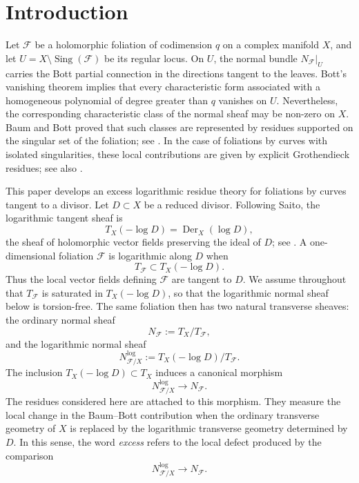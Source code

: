 \documentclass[12pt,reqno,a4paper]{amsart}
\numberwithin{equation}{section}
\theoremstyle{plain}
\theoremstyle{definition}
\DeclareMathOperator{\Sing}{Sing}
\newcommand{\cF}{\mathcal{F}}
\newcommand{\Der}{\operatorname{Der}}
\begin{document}
 


 




\section{Introduction}

 

 
 

Let \(\cF\) be a holomorphic foliation of codimension \(q\) on a complex
manifold \(X\), and let \(U=X\setminus \Sing(\cF)\) be its regular locus. On
\(U\), the normal bundle \(N_{\cF}|_U\) carries the Bott partial connection in
the directions tangent to the leaves. Bott's vanishing theorem implies that
every characteristic form associated with a homogeneous polynomial of degree
greater than \(q\) vanishes on \(U\). Nevertheless, the corresponding
characteristic class of the normal sheaf may be non-zero on \(X\). Baum and
Bott proved that such classes are represented by residues supported on the
singular set of the foliation; see \cite{BB2,BB1}. In the case of foliations by
curves with isolated singularities, these local contributions are given by
explicit Grothendieck residues; see also \cite{Suwa}.

This paper develops an excess logarithmic residue theory for foliations by
curves tangent to a divisor. Let \(D\subset X\) be a reduced divisor. Following
Saito, the logarithmic tangent sheaf is
\[
T_X(-\log D)=\Der_X(\log D),
\]
the sheaf of holomorphic vector fields preserving the ideal of \(D\); see
\cite{Saito}. A one-dimensional foliation \(\cF\) is logarithmic along \(D\)
when
\[
T_{\cF}\subset T_X(-\log D).
\]
Thus the local vector fields defining \(\cF\) are tangent to \(D\). We assume
throughout that \(T_{\cF}\) is saturated in \(T_X(-\log D)\), so that the
logarithmic normal sheaf below is torsion-free. The same foliation then has two
natural transverse sheaves: the ordinary normal sheaf
\[
N_{\cF}:=T_X/T_{\cF},
\]
and the logarithmic normal sheaf
\[
N_{\cF/X}^{\log}:=T_X(-\log D)/T_{\cF}.
\]
The inclusion \(T_X(-\log D)\subset T_X\) induces a canonical morphism
\[
N_{\cF/X}^{\log}\longrightarrow N_{\cF}.
\]
The residues considered here are attached to this morphism. They measure the
local change in the Baum--Bott contribution when the ordinary transverse
geometry of \(X\) is replaced by the logarithmic transverse geometry determined
by \(D\). In this sense, the word \textit{excess} refers to the local defect produced
by the comparison
\[
N_{\cF/X}^{\log}\longrightarrow N_{\cF}.
\]
\end{document}
